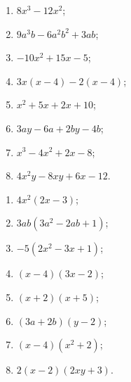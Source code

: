 \documentclass[11pt,a4paper]{article}
\begin{document}
\begin{zadaniReseniBox}[breakable=false,title={Domácí úkol}]
\begin{enumerate}[label=\alph*)]
\item $8x^3-12x^2$;
\item $9a^3b-6a^2b^2+3ab$;
\item $-10x^2+15x-5$;
\item $3x(x-4)-2(x-4)$;
\item $x^2+5x+2x+10$;
\item $3ay-6a+2by-4b$;
\item $x^3-4x^2+2x-8$;
\item $4x^2y-8xy+6x-12$.
\end{enumerate}
\tcblower
\begin{enumerate}[label=\alph*)]
\item $4x^2(2x-3)$;
\item $3ab(3a^2-2ab+1)$;
\item $-5(2x^2-3x+1)$;
\item $(x-4)(3x-2)$;
\item $(x+2)(x+5)$;
\item $(3a+2b)(y-2)$;
\item $(x-4)(x^2+2)$;
\item $2(x-2)(2xy+3)$.
\end{enumerate}
\end{zadaniReseniBox}
\end{document}
